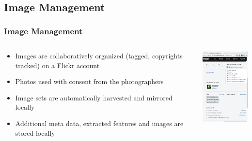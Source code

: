 \documentclass[]{beamer}
\begin{document}
    \subsection{Image Management}
    \begin{frame}
        \frametitle{Image Management}

        \begin{minipage}[c]{\textwidth}
            \begin{columns}[T]
                \begin{column}{0.6\textwidth}
                    \begin{itemize}
                        \item Images are collaboratively organized (tagged, copyrights tracked) on
                        a Flickr account
                        \item Photos used with consent from the photographers
                        \item Image sets are automatically harvested and mirrored locally
                        \item Additional meta data, extracted features and images are stored locally
                    \end{itemize}
                \end{column}
                \begin{column}{0.3\textwidth}
                    \includegraphics[width=3.5cm]{flickr_metadata}
                \end{column}
            \end{columns}
        \end{minipage}
    \end{frame}

\end{document}
